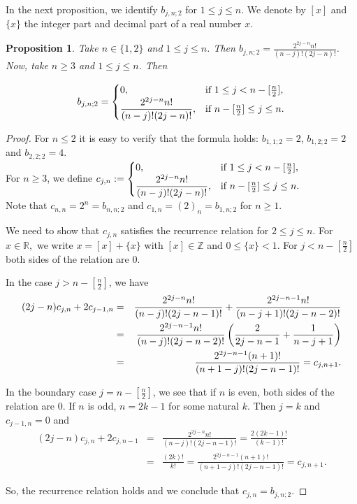\documentclass[a4paper,12pt]{amsart}
\def\RR{\mathbb R}
\def\ZZ{\mathbb Z}
\newtheorem{proposition}[thm]{Proposition}
\theoremstyle{definition}
\theoremstyle{remark}
\begin{document}
In the next proposition, we identify
$b_{j,n;2}$ for $1\le j\le n.$ We denote by $[x]$ and $\{x\}$ the integer part and decimal part of a real number $x$.

\begin{proposition}\label{partii} Take $n\in\{1,2\}$ and $1\le j\le n$. Then $\displaystyle b_{j,n;2}=\frac{2^{2j-n} n!}{(n-j)!(2j-n)!}$.
Now, take $n\ge 3$ and $1\le j\le n$. Then

$$b_{j,n;2}=  \begin{cases}
0, & \text{if } 1\le j <  n-[{n\over 2}], \\
\displaystyle \frac{2^{2j-n} n!}{(n-j)!(2j-n)!}, & \text{if } n-[{n\over 2}]\leq j \leq n.
\end{cases}
$$

\end{proposition}
\begin{proof}
For $n \le 2$ it is easy to verify that the formula holds: $b_{1,1;2}=2$, $b_{1,2;2}=2$ and $b_{2,2;2}=4$. \\

For $n\ge 3$, we define $c_{j,n}:=  \begin{cases}
0, & \text{if } 1\le j <  n-[{n\over 2}], \\
\displaystyle \frac{2^{2j-n} n!}{(n-j)!(2j-n)!}, & \text{if } n-[{n\over 2}]\leq j \leq n.
\end{cases}$\\

Note that $c_{n,n}=2^n=b_{n,n;2}$ and $c_{1,n}=(2)_n=b_{1,n;2}$ for $n\ge 1.$

We need to show that $c_{j,n}$ satisfies the recurrence relation for $2 \le j \le n$. For $x\in \RR,$ we write $x=[x]+\{x\}$ with $[x]\in \ZZ$ and $0\le \{x\}<1$. For $j < n-[\frac{n}{2}]$ both sides of the relation are $0$.

In the case $j > n-[\frac{n}{2}]$, we have
\begin{eqnarray*}
(2j-n)c_{j,n}+2c_{j-1,n}&=&\frac{2^{2j-n}n!}{(n-j)!(2j-n-1)!}+\frac{2^{2j-n-1}n!}{(n-j+1)!(2j-n-2)!}\\
&=&\frac{2^{2j-n-1}n!}{(n-j)!(2j-n-2)!}\left(\frac{2}{2j-n-1}+\frac{1}{n-j+1}\right)\cr&=&\frac{2^{2j-n-1}(n+1)!}{(n+1-j)!(2j-n-1)!}=c_{j,n+1}.
\end{eqnarray*}


In the boundary case $j=n-[\frac{n}{2}]$, we see that if $n$ is even, both sides of the relation are 0. If $n$ is odd, $n=2k-1$ for some natural $k$. Then $j=k$ and $c_{j-1,n}=0$ and
\begin{eqnarray*}
  (2j-n)c_{j,n}+2c_{j,n-1}&=&\frac{2^{2j-n}n!}{(n-j)!(2j-n-1)!}=\frac{2(2k-1)!}{(k-1)!}\\
  &=&\frac{(2k)!}{k!}=\frac{2^{2j-n-1}(n+1)!}{(n+1-j)!(2j-n-1)!}=c_{j,n+1}.
\end{eqnarray*}



So, the recurrence relation holds and we conclude that $c_{j,n}=b_{j,n;2}$.\end{proof}
\end{document}
